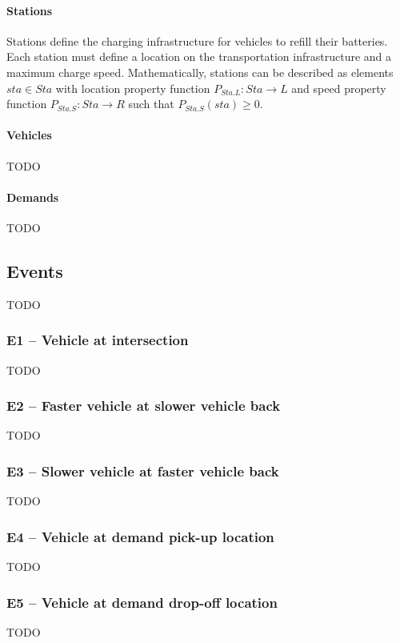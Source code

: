 \documentclass{article}
\begin{document}
    \paragraph{Stations}
    Stations define the charging infrastructure for vehicles to refill their batteries.
    Each station must define a location on the transportation infrastructure and a maximum charge speed.
    Mathematically, stations can be described as elements $sta \in Sta$ with location property function $P_{Sta.L}: Sta \rightarrow L$ and speed property function $P_{Sta.S}: Sta \rightarrow R$ such that $P_{Sta.S}(sta) \geq 0$.

    \paragraph{Vehicles}
    TODO

    \paragraph{Demands}
    TODO

    \subsection{Events}
    \label{sec:events}
    TODO

    \subsubsection{E1 -- Vehicle at intersection}
    TODO

    \subsubsection{E2 -- Faster vehicle at slower vehicle back}
    TODO

    \subsubsection{E3 -- Slower vehicle at faster vehicle back}
    TODO

    \subsubsection{E4 -- Vehicle at demand pick-up location}
    TODO

    \subsubsection{E5 -- Vehicle at demand drop-off location}
    TODO
\end{document}
